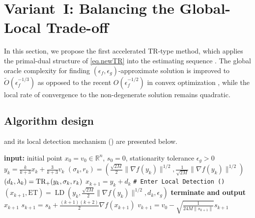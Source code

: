 \documentclass[moor,sglanonrev]{informs4}
\begin{document}
\section{Variant~I: Balancing the Global-Local Trade-off}\label{sec.first variant}
In this section, we propose the first accelerated TR-type method, which applies the primal-dual structure of \ref{eq.newTR} into the estimating sequence \cite{nesterov2008accelerating}. The global oracle complexity for finding $(\epsilon_f,\epsilon_g)$-approximate solution is improved to $\tilde O(\epsilon_f^{-1/3})$ as opposed to the recent $O(\epsilon_f^{-1/2})$ in convex optimization \cite{jiang2026beyond}, while the local rate of convergence to the non-degenerate solution remains quadratic.
\subsection{Algorithm design}
 and its local detection mechanism () are presented below.
\begin{algorithm}[ht]
    \caption{Accelerated Trust-Region Method with Local Detection (\atr{})}\label{alg.accelerated utr}
    \begin{algorithmic}[1]
        \STATE \textbf{input:} initial point $x_0=v_0\in \mathbb{R}^n$, $s_0=0$, stationarity tolerance $\epsilon_g>0$
        \STATE $y_k = \frac{k}{k+3}x_k+\frac{3}{k+3}v_k$
        \STATE $(\sigma_k,r_k) = (\tfrac{\sqrt{2M}}{2}\|\nabla f(y_k)\|^{1/2},\tfrac{1}{\sqrt{2M}}\|\nabla f(y_k)\|^{1/2})$
        \label{line.set-params}
        \STATE $(d_k,\lambda_k) = \textrm{TR}_+(y_k,\sigma_k,r_k)$
        \STATE $x_{k+1} = y_k+d_k$
         \label{line.if}
        \STATE \texttt{\# Enter Local Detection ()}
        \STATE $(x_{k+1},\text{ET}) = \operatorname{LD}(y_k,\tfrac{\sqrt{2M}}{2}\|\nabla f(y_k)\|^{1/2},d_k,\epsilon_g)$
        \label{line.early terminate main}
        \STATE \textbf{terminate and output $x_{k+1}$}
        \ENDIF
        \ENDIF
        \STATE $s_{k+1} = s_{k}+\tfrac{(k+1)(k+2)}{2}\nabla f(x_{k+1})$
        \label{line.update-s}
        \STATE $v_{k+1} = v_0-\sqrt{\tfrac{1}{24M\|s_{k+1}\|}}s_{k+1}$
        \label{line.update-v}
        \ENDFOR
    \end{algorithmic}
\end{algorithm}
\end{document}

